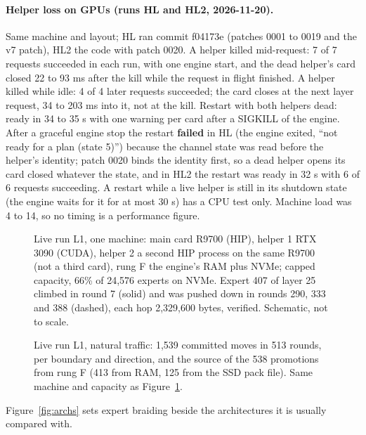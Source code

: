 \documentclass[11pt]{article}
\begin{document}
\paragraph{Helper loss on GPUs (runs HL and HL2, 2026-11-20).} Same machine and layout; HL ran commit f04173e (patches 0001 to 0019 and the v7 patch), HL2 the code with patch 0020. A helper killed mid-request: 7 of 7 requests succeeded in each run, with one engine start, and the dead helper's card closed 22 to 93 ms after the kill while the request in flight finished. A helper killed while idle: 4 of 4 later requests succeeded; the card closes at the next layer request, 34 to 203 ms into it, not at the kill. Restart with both helpers dead: ready in 34 to 35 s with one warning per card after a SIGKILL of the engine. After a graceful engine stop the restart \textbf{failed} in HL (the engine exited, ``not ready for a plan (state 5)'') because the channel state was read before the helper's identity; patch 0020 binds the identity first, so a dead helper opens its card closed whatever the state, and in HL2 the restart was ready in 32 s with 6 of 6 requests succeeding. A restart while a live helper is still in its shutdown state (the engine waits for it for at most 30 s) has a CPU test only. Machine load was 4 to 14, so no timing is a performance figure.

\begin{figure}[t]
\centering

\caption{Live run L1, one machine: main card R9700 (HIP), helper 1 RTX 3090 (CUDA), helper 2 a second HIP process on the same
R9700 (not a third card), rung F the engine's RAM plus NVMe; capped capacity, 66\% of 24,576 experts on NVMe. Expert 407 of layer
25 climbed in round 7 (solid) and was pushed down in rounds 290, 333 and 388 (dashed), each hop 2,329,600 bytes, verified.
Schematic, not to scale.}
\label{fig:pyramid-live}
\end{figure}

\begin{figure}[t]
\centering

\caption{Live run L1, natural traffic: 1,539 committed moves in 513 rounds, per boundary and direction, and the source of the
538 promotions from rung F (413 from RAM, 125 from the SSD pack file). Same machine and capacity as Figure~\ref{fig:pyramid-live}.}
\label{fig:l1-moves}
\end{figure}

Figure~\ref{fig:archs} sets expert braiding beside the architectures it is usually compared with.
\end{document}
